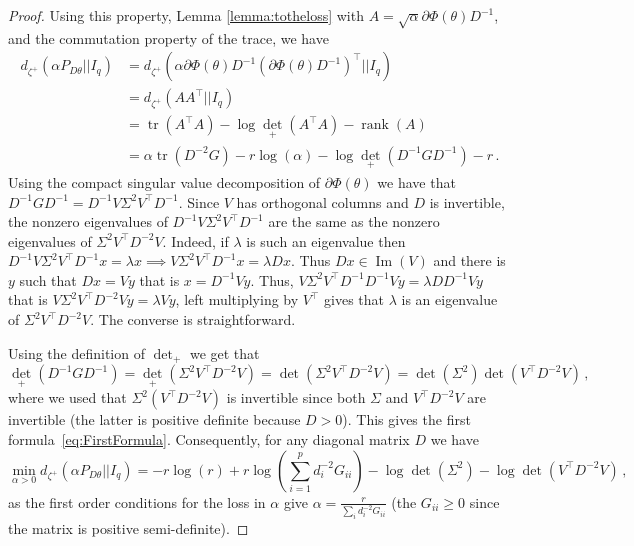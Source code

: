 \documentclass{article}
\theoremstyle{plain}
\theoremstyle{definition}
\theoremstyle{remark}
\def\tr{{\operatorname{tr}}}
\def\rank{\operatorname{rank}}
\begin{document}
{\begin{proof}
Using this property, Lemma \ref{lemma:totheloss} with $A = \sqrt{\alpha}\partial \Phi(\theta) D^{-1}$, and the commutation property of the trace, we have
\begin{equation}
    \begin{split}
    d_{\zeta^+}(\alpha P_{D \theta}|| I_q) &= d_{\zeta^+}(\alpha \partial \Phi(\theta) D^{-1} (\partial \Phi(\theta) D^{-1})^\top|| I_q) \\
    &= d_{\zeta^+}(A A^\top|| I_q) \\
    &= \tr(A^\top A) - \log {\det}_+(A^\top A) - \rank(A)  \\
    &= \alpha \tr(D^{-2} G)   - r \log(
\alpha
    ) - \log {\det}_+(D^{-1} G D^{-1}) - r\,.
    \end{split}
\end{equation} 
Using the compact singular value decomposition of $\partial \Phi(\theta)$ we have that $D^{-1} G D^{-1} = D^{-1} V \Sigma^2 V^\top D^{-1}$. 
Since $V$ has orthogonal columns and $D$ is invertible, the nonzero eigenvalues of $D^{-1} V \Sigma^2 V^\top D^{-1}$ 
are the same as the nonzero eigenvalues of $\Sigma^2 V^\top D^{-2} V$. 
Indeed, if $\lambda$ is such an eigenvalue then $D^{-1} V \Sigma^2 V^\top D^{-1} x = \lambda x \implies V \Sigma^2 V^\top D^{-1} x = \lambda D x$. 
Thus $Dx \in \operatorname{Im}(V)$ and there is $y$ such that $Dx = V y$ that is $x = D^{-1} V y$. 
Thus, $V \Sigma^2 V^\top D^{-1} D^{-1} V y = \lambda D D^{-1} V y$ that is $V \Sigma^2 V^\top D^{-2}V y = \lambda  V y$, 
left multiplying by $V^\top$ gives that $\lambda$ is an eigenvalue of $\Sigma^2 V^\top D^{-2} V$. The converse is straightforward. 

Using the definition of ${\det}_+$ we get that 
\begin{equation}
    \label{eq:propgeneralizeddet}
    {\det}_+(D^{-1} G D^{-1}) = {\det}_+(\Sigma^2 V^\top D^{-2} V) = {\det}(\Sigma^2 V^\top D^{-2} V) = \det(\Sigma^2) \det(V^\top D^{-2} V)\,,
\end{equation}
where we used that $\Sigma^2 (V^\top D^{-2} V)$ is invertible since both $\Sigma$ and $V^\top D^{-2} V$ are invertible 
(the latter is positive definite because $D > 0$).
This gives the first formula~\eqref{eq:FirstFormula}. 
Consequently, for any diagonal matrix $D$ we have
\begin{equation}\label{eq:MinAlphaOnly}
    \min_{\alpha > 0} d_{\zeta^+}(\alpha P_{D \theta}|| I_q) = - r \log(r) + r \log(\sum_{i=1}^p d_i^{-2} G_{ii}) - \log {\det}(\Sigma^2) - \log {\det}(V^\top D^{-2} V)\,,
\end{equation}
as the first order conditions for the loss in $\alpha$ 
give $\alpha = \frac{r}{\sum_i d_i^{-2} G_{ii}}$ 
(the $G_{ii} \geq 0$ since the matrix is positive semi-definite).


\end{proof}}
\end{document}
